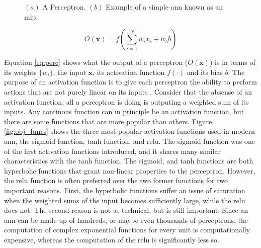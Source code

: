 \begin{figure}[H]
\begin{center}
    
\end{center}
\caption{$(a)$ A Perceptron. $(b)$ Example of a simple \acrshort{ann} known as an \acrshort{mlp}.} 
\label{fig:perc_nn}
\end{figure}

\begin{equation}
    O(\mathbf{x}) = f \left ( \sum_{i = 1}^N w_i x_i + w_b b\right )
    \label{eq:perc}
\end{equation}

Equation \eqref{eq:perc} shows what the output of a perceptron ($O(\mathbf{x})$) is in terms of its weights $\{w_i\}$, the input $\mathbf{x}$, its activation function $f(\cdot)$ and its bias $b$. The purpose of an activation function is to give each perceptron the ability to perform actions that are not purely linear on its inputs \cite{dl_book}. Consider that the absense of an activation function, all a perceptron is doing is outputing a weighted sum of its inputs. Any continous function can in principle be an activation function, but there are some functions that are more popular than others. Figure \ref{fig:obj_funcs} shows the three most popular activation functions used in modern \acrshort{ann}, the sigmoid function, $\mathrm{tanh}$ function, and \acrfull{relu}. The sigmoid function was one of the first activation functions introduced, and it shares many similar characteristics with the $\mathrm{tanh}$ function. The sigmoid, and $\mathrm{tanh}$ functions are both hyperbolic functions that grant non-linear properties to the perceptron. However, the \acrshort{relu} function is often preferred over the two former functions for two important reasons. First, the hyperbolic functions suffer an issue of saturation when the weighted sums of the input becomes sufficiently large, while the \acrshort{relu} does not. The second reason is not as technical, but is still important. Since an \acrshort{ann} can be made up of hundreds, or maybe even thousands of perceptrons, the computation of complex exponential functions for every unit is computationally expensive, whereas the computation of the \acrshort{relu} is significantly less so. 

